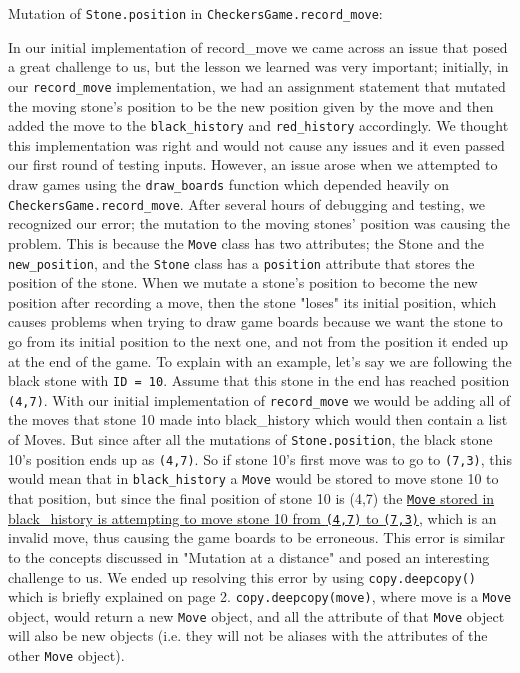 \documentclass[fontsize=11pt]{article}
\begin{document}
Mutation of \texttt{Stone.position} in \texttt{CheckersGame.record\_move}:

In our initial implementation of record\_move we came across an issue that posed a great challenge to us, but the lesson we learned was very important;
initially, in our \texttt{record\_move} implementation, we had an assignment statement that mutated the moving stone's position to be the new position given by the move and then added the move to the \texttt{black\_history} and \texttt{red\_history} accordingly. We thought this implementation was right and would not cause any issues and it even passed our first round of testing inputs. However, an issue arose when we attempted to draw games using the \texttt{draw\_boards} function which depended heavily on \texttt{CheckersGame.record\_move}. After several hours of debugging and testing, we recognized our error; the mutation to the moving stones' position was causing the problem. This is because the \texttt{Move} class has two attributes;  the Stone and the \texttt{new\_position}, and the \texttt{Stone} class has a \texttt{position} attribute that stores the position of the stone. When we mutate a stone's position to become the new position after recording a move, then the stone "loses" its initial position, which causes problems when trying to draw game boards because we want the stone to go from its initial position to the next one, and not from the position it ended up at the end of the game. 
To explain with an example, let's say we are following the black stone with \texttt{ID = 10}. Assume that this stone in the end has reached position \texttt{(4,7)}. With our initial implementation of \texttt{record\_move} we would be adding all of the moves that stone 10 made into black\_history which would then contain a list of Moves. But since after all the mutations of \texttt{Stone.position}, the black stone 10's position ends up as \texttt{(4,7)}. So if stone 10's first move was to go to \texttt{(7,3)}, this would mean that in \texttt{black\_history} a \texttt{Move} would be stored to move stone 10 to that position, but since the final position of stone 10 is (4,7) the \underline{\texttt{Move} stored in black\_history is attempting to move stone 10 from \texttt{(4,7)} to \texttt{(7,3)}}, which is an invalid move,  thus causing the game boards to be erroneous. This error is similar to the concepts discussed in "Mutation at a distance" and posed an interesting challenge to us.
We ended up resolving this error by using \texttt{copy.deepcopy()} which is briefly explained on page 2. \texttt{copy.deepcopy(move)}, where move is a \texttt{Move} object, would return a new \texttt{Move} object, and all the attribute of that \texttt{Move} object will also be new objects (i.e. they will not be aliases with the attributes of the other \texttt{Move} object).
\end{document}
